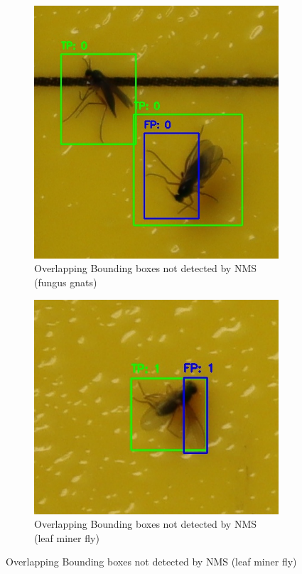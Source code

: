 \documentclass[12pt,a4paper]{article}
\begin{document}
\begin{figure}[H]
    \centering
    \begin{subfigure}[b]{0.45\textwidth}
        \centering
        \includegraphics[width=\textwidth]{images/low_iou_nms_BRAIIM.png}
        \caption{Overlapping Bounding boxes not detected by NMS (fungus gnats)}
    \end{subfigure}
    \hfill
    \begin{subfigure}[b]{0.45\textwidth}
        \centering
        \includegraphics[width=\textwidth]{images/low_io_nms_LIRIBO.png}
        \caption{Overlapping Bounding boxes not detected by NMS (leaf miner fly)}
    \end{subfigure}
    

\end{figure}
\end{document}
